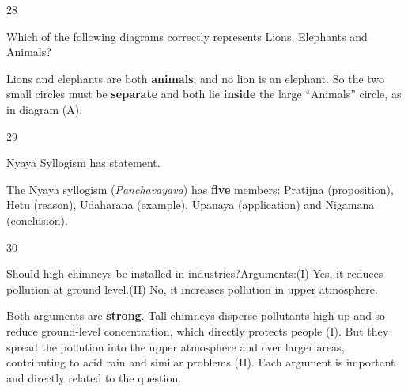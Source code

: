 \begin{question}{28}
{Which of the following diagrams correctly represents Lions, Elephants and Animals?\par}
\begin{explain}
Lions and elephants are both \textbf{animals}, and no lion is an elephant. So the two small circles must be \textbf{separate} and both lie \textbf{inside} the large ``Animals'' circle, as in diagram (A).
\begin{center}
\end{center}
\end{explain}
\end{question}

\begin{question}{29}
{Nyaya Syllogism has \blank{} statement.\par}
\begin{explain}
The Nyaya syllogism (\emph{Panchavayava}) has \textbf{five} members: Pratijna (proposition), Hetu (reason), Udaharana (example), Upanaya (application) and Nigamana (conclusion).
\end{explain}
\end{question}

\begin{question}{30}
{Should high chimneys be installed in industries?\newline Arguments:\newline (I) Yes, it reduces pollution at ground level.\newline (II) No, it increases pollution in upper atmosphere.\par}
\begin{explain}
Both arguments are \textbf{strong}. Tall chimneys disperse pollutants high up and so reduce ground-level concentration, which directly protects people (I). But they spread the pollution into the upper atmosphere and over larger areas, contributing to acid rain and similar problems (II). Each argument is important and directly related to the question.
\end{explain}
\end{question}

